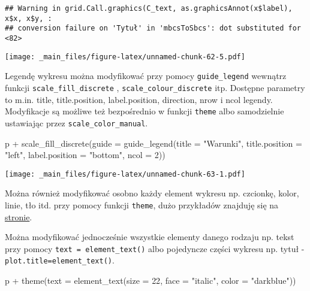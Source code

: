 \documentclass[
]{book}
\newenvironment{Shaded}{\begin{snugshade}}{\end{snugshade}}
\newcommand{\AttributeTok}[1]{\textcolor[rgb]{0.77,0.63,0.00}{#1}}
\newcommand{\DecValTok}[1]{\textcolor[rgb]{0.00,0.00,0.81}{#1}}
\newcommand{\FunctionTok}[1]{\textcolor[rgb]{0.00,0.00,0.00}{#1}}
\newcommand{\NormalTok}[1]{#1}
\newcommand{\SpecialCharTok}[1]{\textcolor[rgb]{0.00,0.00,0.00}{#1}}
\newcommand{\StringTok}[1]{\textcolor[rgb]{0.31,0.60,0.02}{#1}}
\begin{document}
\begin{verbatim}
## Warning in grid.Call.graphics(C_text, as.graphicsAnnot(x$label), x$x, x$y, :
## conversion failure on 'Tytuł' in 'mbcsToSbcs': dot substituted for <82>
\end{verbatim}

\texttt{[image: \_main\_files/figure-latex/unnamed-chunk-62-5.pdf]}

Legendę wykresu można modyfikować przy pomocy \texttt{guide\_legend} wewnątrz funkcji \texttt{scale\_fill\_discrete} , \texttt{scale\_colour\_discrete} itp. Dostępne parametry to m.in. title, title.position, label.position, direction, nrow i ncol legendy. Modyfikacje są możliwe też bezpośrednio w funkcji \texttt{theme} albo samodzielnie ustawiając przez \texttt{scale\_color\_manual}.

\begin{Shaded}
\begin{Highlighting}[]
\NormalTok{p }\SpecialCharTok{+} \FunctionTok{scale\_fill\_discrete}\NormalTok{(}\AttributeTok{guide =} \FunctionTok{guide\_legend}\NormalTok{(}\AttributeTok{title =} \StringTok{"Warunki"}\NormalTok{, }
                                           \AttributeTok{title.position =} \StringTok{"left"}\NormalTok{, }
                                           \AttributeTok{label.position =} \StringTok{"bottom"}\NormalTok{, }\AttributeTok{ncol =} \DecValTok{2}\NormalTok{))}
\end{Highlighting}
\end{Shaded}

\texttt{[image: \_main\_files/figure-latex/unnamed-chunk-63-1.pdf]}

Można również modyfikować osobno każdy element wykresu np. czcionkę, kolor, linie, tło itd. przy pomocy funkcji \texttt{theme}, dużo przykładów znajduję się na \href{http://docs.ggplot2.org/current/theme.html}{stronie}.

Można modyfikować jednocześnie wszystkie elementy danego rodzaju np. tekst przy pomocy \texttt{text\ =\ element\_text()} albo pojedyncze części wykresu np. tytuł - \texttt{plot.title=element\_text()}.

\begin{Shaded}
\begin{Highlighting}[]
\NormalTok{p }\SpecialCharTok{+} \FunctionTok{theme}\NormalTok{(}\AttributeTok{text =} \FunctionTok{element\_text}\NormalTok{(}\AttributeTok{size =} \DecValTok{22}\NormalTok{, }\AttributeTok{face =} \StringTok{"italic"}\NormalTok{, }\AttributeTok{color =} \StringTok{"darkblue"}\NormalTok{))}
\end{Highlighting}
\end{Shaded}
\end{document}
